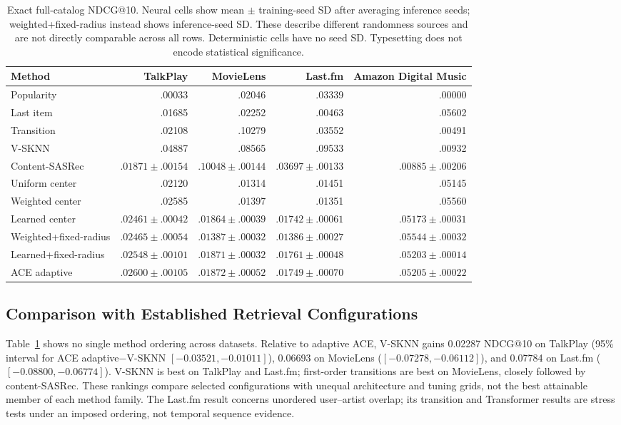 \documentclass[runningheads]{llncs}
\newcommand{\method}{\textsc{ACE}}
\begin{document}
\begin{table}[t]
\centering\scriptsize
\setlength{\tabcolsep}{2pt}
\caption{Exact full-catalog NDCG@10. Neural cells show mean $\pm$ training-seed
SD after averaging inference seeds; weighted+fixed-radius instead shows
inference-seed SD. These describe different randomness sources and are not
directly comparable across all rows. Deterministic cells have no seed SD. Typesetting does not
encode statistical significance.}
\label{tab:main-results}
\begin{tabular}{lrrrr}
\toprule
Method & TalkPlay & MovieLens & Last.fm & Amazon Digital Music\\
\midrule
Popularity & .00033 & .02046 & .03339 & .00000\\
Last item & .01685 & .02252 & .00463 & .05602\\
Transition & .02108 & .10279 & .03552 & .00491\\
V-SKNN & .04887 & .08565 & .09533 & .00932\\
Content-SASRec & $.01871\!\pm\!.00154$ & $.10048\!\pm\!.00144$ & $.03697\!\pm\!.00133$ & $.00885\!\pm\!.00206$\\
\midrule
Uniform center & .02120 & .01314 & .01451 & .05145\\
Weighted center & .02585 & .01397 & .01351 & .05560\\
Learned center & $.02461\!\pm\!.00042$ & $.01864\!\pm\!.00039$ & $.01742\!\pm\!.00061$ & $.05173\!\pm\!.00031$\\
Weighted+fixed-radius & $.02465\!\pm\!.00054$ & $.01387\!\pm\!.00032$ & $.01386\!\pm\!.00027$ & $.05544\!\pm\!.00032$\\
Learned+fixed-radius & $.02548\!\pm\!.00101$ & $.01871\!\pm\!.00032$ & $.01761\!\pm\!.00048$ & $.05203\!\pm\!.00014$\\
\method{} adaptive & $.02600\!\pm\!.00105$ & $.01872\!\pm\!.00052$ & $.01749\!\pm\!.00070$ & $.05205\!\pm\!.00022$\\
\bottomrule
\end{tabular}
\end{table}

\subsection{Comparison with Established Retrieval Configurations}

Table~\ref{tab:main-results} shows no single method ordering across datasets.
Relative
to adaptive \method{}, V-SKNN gains 0.02287 NDCG@10 on TalkPlay (95\% interval
for \method{} adaptive$-$V-SKNN $[-0.03521,-0.01011]$), 0.06693 on MovieLens
($[-0.07278,-0.06112]$), and 0.07784 on Last.fm
($[-0.08800,-0.06774]$). V-SKNN is best on TalkPlay and Last.fm; first-order
transitions are best on MovieLens, closely followed by content-SASRec. These
rankings compare selected configurations with unequal architecture and tuning
grids, not the best attainable member of each method family. The Last.fm result
concerns unordered user--artist overlap;
its transition and Transformer results are stress tests under an imposed
ordering, not temporal sequence evidence.
\end{document}
